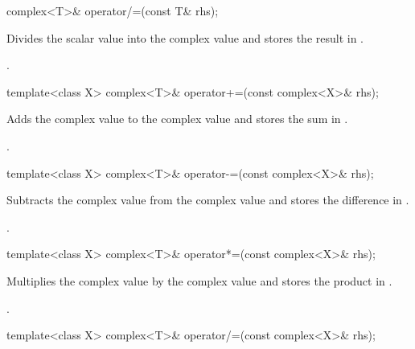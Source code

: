 %
\begin{itemdecl}
complex<T>& operator/=(const T& rhs);
\end{itemdecl}

\begin{itemdescr}
\pnum
\effects
Divides the scalar value  into the complex value
and stores the result in
.

\pnum
\returns
{}.
\end{itemdescr}

%
\begin{itemdecl}
template<class X> complex<T>& operator+=(const complex<X>& rhs);
\end{itemdecl}

\begin{itemdescr}
\pnum
\effects
Adds the complex value  to the complex value
and stores the sum in
.

\pnum
\returns
{}.
\end{itemdescr}

%
\begin{itemdecl}
template<class X> complex<T>& operator-=(const complex<X>& rhs);
\end{itemdecl}

\begin{itemdescr}
\pnum
\effects
Subtracts the complex value  from the complex value
and stores the difference in
.

\pnum
\returns
{}.
\end{itemdescr}

%
\begin{itemdecl}
template<class X> complex<T>& operator*=(const complex<X>& rhs);
\end{itemdecl}

\begin{itemdescr}
\pnum
\effects
Multiplies the complex value  by the complex value
and stores the product in
.

\pnum
\returns
{}.
\end{itemdescr}

%
\begin{itemdecl}
template<class X> complex<T>& operator/=(const complex<X>& rhs);
\end{itemdecl}

